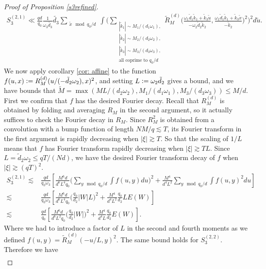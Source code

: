 \begin{proof}[Proof of Proposition \ref{s3refined}]
    \begin{align*}
        S_3^{(2,1)}\ll
        \frac{qd}{q_0} \frac{1}{\omega_3\tilde{d_3}}\tilde{d_3} \sum_{\substack{\tilde{x} \mod q_0/d} }\int\Bigg(\sum_{\substack{|\tilde{k}_1|\sim M_1/(d_1\omega_1),\\|\tilde{k}_2|\sim M_2/(d_2\omega_2),\\|\tilde{k}_3|\sim M_3/(d_3\omega_3),\\
        \textrm{all coprime to $q_0/d$}}}
        \tilde{R}_M^{(d)}\Big(\frac{\omega_1\tilde{d}_1\tilde{k}_1+\tilde{k}_3\tilde{u}}{-\omega_2\tilde{d}_2\tilde{k}_2},\frac{\omega_1\tilde{d}_1\tilde{k}_1+\tilde{k}_3 \tilde{x}}{-\tilde{k}_2}\Big)^2\Bigg)^2 d\tilde{u}.
    \end{align*}
    We now apply corollary \ref{cor: affine} to the function $f(u,x)\mathrel{\mathop:}= R_M^{(d)}(u/(-\tilde{d}_2\omega_2),x)^2$, and setting $L\mathrel{\mathop:}=\omega_2\tilde{d}_2$ gives a bound, and we have bounds that $\tilde{M} = \max(ML/(d_2\omega_2) ,M_1/(d_1\omega_1),M_3/(d_3\omega_3))\leq M/d $. First we confirm that $f$ has the desired Fourier decay.
    Recall that $R_M^{(d)}$ is obtained by folding and averaging $R_M$ in the second argument, so it actually suffices to check the Fourier decay in $R_M$.
    Since $R_M^2$ is obtained from a convolution with a bump function of length $NM/q\lesssim T$, its Fourier transform in the first argument is rapidly decreasing when
    $|\xi|\gtrsim T$. So that the scaling of $1/L$ means that $f$ has Fourier transform rapidly decreasing when $|\xi|\gtrsim TL$. Since $L=\tilde{d}_2\omega_2\leq qT/(Nd)$, we 
    have the desired Fourier transform decay of $f$ when $|\xi|\gtrsim (qT)^2$.
    \begin{align*}
        S_3^{(2,1)}\lesssim &  \frac{qd}{q_0\omega_3}\left[\frac{M^6d}{d^6L^4q_0}\Big(\sum_{y \mod q_0/d } \int f(u,y) du\Big)^2  + \frac{M^4}{d^4L^2}\sum_{y\mod q_0/d} \int f(u,y)^2 du
        \right]\\
        \lesssim& \frac{qd}{q_0\omega_3}\left[\frac{M^6d}{d^6L^4q_0}\Big(\frac{q_0}{d_2}|W|L)^2  + \frac{M^4}{d^4L^2}\frac{q_0}{d_2}LE(W)
        \right]\\
        \lesssim & \frac{qd}{q_0}\left[\frac{M^6d}{d^6L^2q_0}\Big(\frac{q_0}{d_2}|W|)^2  + \frac{M^4}{d^4L}\frac{q_0}{d_2}E(W)\right].
    \end{align*}
    Where we had to introduce a factor of $L$ in the second and fourth moments as we defined $f(u,y) = \tilde{R}_M^{(d)}(-u/L,y)^2$. 
    The same bound holds for $S^{(2,2)}_3$.
    Therefore we have \begin{align*}

\end{align*}
\end{proof}
